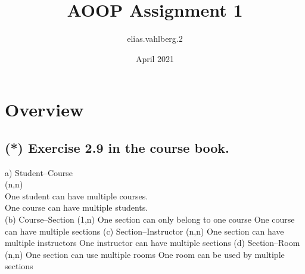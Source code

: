 \documentclass{article}
\title{AOOP Assignment 1 }
\author{elias.vahlberg.2 }
\date{April 2021}
\begin{document}
\maketitle

\section*{Overview}
\subsection{(*) Exercise 2.9 in the course book.}
a) Student–Course\\
    {\indent (n,n) \\
    One student can have multiple courses.\\
    One course can have multiple students.\\}
(b) Course–Section
    (1,n)
    One section can only belong to one course
    One course can have multiple sections
(c) Section–Instructor
    (n,n)
    One section can have multiple instructors
    One instructor can have multiple sections
(d) Section–Room
    (n,n)
    One section can use multiple rooms
    One room can be used by multiple sections
\end{document}

